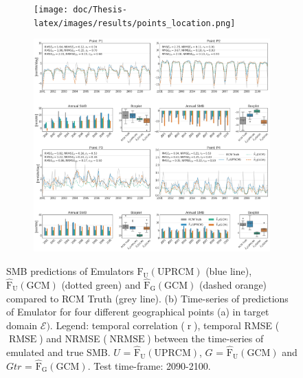 \documentclass[a4paper,11pt,oneside]{report}
\begin{document}
\begin{figure}[tbp]
        \centering
        \begin{subfigure}[b]{0.2\columnwidth}
            \centering \texttt{[image: doc/Thesis-latex/images/results/points\_location.png]}
            \caption[]%
            {{\small}}    
          \label{fig:points-location}
        \end{subfigure}
        \hfill
        \begin{subfigure}[b]{\columnwidth}  
            \centering 
           \includegraphics[width=\textwidth]{doc/Thesis-latex/images/results/timeseries_RCM_GCM.pdf}
            \caption[]%
            {{\small }}  
          \label{fig:timeseries-GCM-UPRCM}
        \end{subfigure}
        \hfill
        \caption[]
        {\small SMB predictions of Emulators $\operatorname{\hat{F}_{U}(UPRCM)}$ (blue line), $\operatorname{\hat{F}_{U}(GCM)}$ (dotted green) and $\operatorname{\hat{F}_{G}(GCM)}$ (dashed orange) compared to RCM Truth (grey line). (b) Time-series of predictions of Emulator for four different geographical points (a) in target domain $\mathcal{E})$. Legend: temporal correlation ($\operatorname{r}$), temporal RMSE ($\operatorname{RMSE}$) and NRMSE ($\operatorname{NRMSE}$) between the time-series of emulated and true SMB. $U$ = $\operatorname{\hat{F}_{U}(UPRCM)}$, $G$ = $\operatorname{\hat{F}_{U}(GCM)}$ and $Gtr$ = $\operatorname{\hat{F}_{G}(GCM)}$. Test time-frame: 2090-2100. } 
        \label{fig:points-timeseries-GCM-UPRCM}
    \end{figure}
\end{document}
